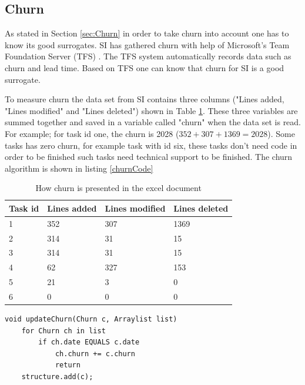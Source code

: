 \documentclass[UKenglish]{ifimaster}  %
\begin{document}
\subsection{Churn}
\label{sec:churn}
As stated in Section \ref{sec:Churn} in order to take churn into account one has to know its good surrogates. SI has gathered churn with help of Microsoft's Team Foundation Server (TFS) \parencite{Dag}. The TFS system automatically records data such as churn and lead time. Based on TFS one can know that churn for SI is a good surrogate.

To measure churn the data set from SI contains three columns ("Lines added, "Lines modified" and "Lines deleted") shown in Table \ref{table:churn}. These three variables are summed together and saved in a  variable called "churn" when the data set is read.  For example; for task id one, the churn is 2028 ($352+307+1369 = 2028$). Some tasks has zero churn, for example task with id six, these tasks don't need code in order to be finished such tasks need technical support to be finished. The churn algorithm is shown in listing \ref{churnCode}

\begin{table}[!ht]
\begin{center}
    \begin{tabular}{| l | l | l | l |}
    \hline
\bf{Task id} & \bf{Lines added} & \bf{Lines modified}  & \bf{Lines deleted} \\ \hline
1&352&307&1369\\ \hline
2&314 & 31 & 15 \\ \hline
3&314&31 & 15\\ \hline
4&62&327&153 \\ \hline
5&21&3&0 \\ \hline
6&0&0&0 \\ \hline
\end{tabular}
\caption{How churn is presented in the excel document}
\label{table:churn} %
\end{center}
\end{table}

\begin{minipage}{\textwidth}
\begin{lstlisting}[caption=Pseudocode example of how throughput is measured, label=churnCode]
void updateChurn(Churn c, Arraylist list)
	for Churn ch in list
		if ch.date EQUALS c.date
			ch.churn += c.churn
			return
	structure.add(c);
\end{lstlisting}
 \end{minipage}
 
\end{document}
